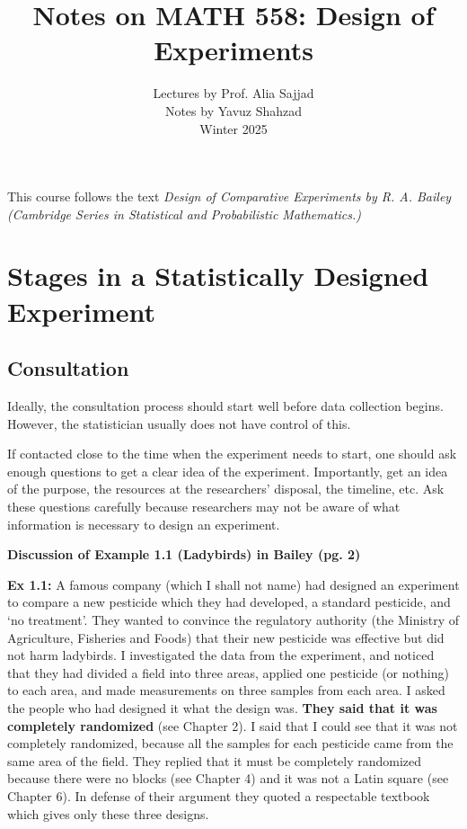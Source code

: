 \documentclass{tufte-book}
\title{Notes on MATH 558: Design of Experiments}
\author[Yavuz Shahzad]{Lectures by Prof. Alia Sajjad\\ Notes by Yavuz Shahzad \\ Winter 2025}
\date{}
\begin{document}
\maketitle

This course follows the text \textit{Design of Comparative 
Experiments by R. A. Bailey (Cambridge Series in Statistical and Probabilistic Mathematics.)}


\section{Stages in a Statistically Designed Experiment}
\subsection{Consultation}

Ideally, the consultation process should start well before data collection begins. However, the statistician usually 
does not have control of this. 

If contacted close to the time when the experiment needs to start, one should ask enough questions to get a clear 
idea of the experiment. Importantly, get an idea of the purpose, the resources at the researchers' disposal, 
the timeline, etc. Ask these questions carefully because researchers may not be aware of what information is 
necessary to design an experiment. \newline

\textbf{Discussion of Example 1.1 (Ladybirds) in Bailey (pg. 2)}

\textbf{Ex 1.1:} A famous company (which I shall not name) had designed an
experiment to compare a new pesticide which they had developed, a standard pesticide, and
‘no treatment’. They wanted to convince the regulatory authority (the Ministry of Agriculture,
Fisheries and Foods) that their new pesticide was effective but did not harm ladybirds.
I investigated the data from the experiment, and noticed that they had divided a field into
three areas, applied one pesticide (or nothing) to each area, and made measurements on three
samples from each area. I asked the people who had designed it what the design was. \textbf{They said that it was completely randomized} (see Chapter 2). I said that I could see that it was not
completely randomized, because all the samples for each pesticide came from the same area
of the field. They replied that it must be completely randomized because there were no blocks
(see Chapter 4) and it was not a Latin square (see Chapter 6). In defense of their argument
they quoted a respectable textbook which gives only these three designs. \newline
\end{document}
